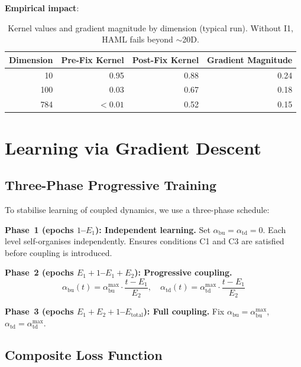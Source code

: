 \documentclass[11pt,a4paper]{article}
\begin{document}
\textbf{Empirical impact}:

\begin{table}[h]
\centering
\begin{tabular}{rrrr}
\toprule
\textbf{Dimension} & \textbf{Pre-Fix Kernel} & \textbf{Post-Fix Kernel} & \textbf{Gradient Magnitude} \\
\midrule
10  & 0.95     & 0.88 & 0.24 \\
100 & 0.03     & 0.67 & 0.18 \\
784 & $<0.01$  & 0.52 & 0.15 \\
\bottomrule
\end{tabular}
\caption{Kernel values and gradient magnitude by dimension (typical run). Without I1, HAML fails beyond $\sim$20D.}
\label{tab:kernelfix}
\end{table}

\section{Learning via Gradient Descent}

\subsection{Three-Phase Progressive Training}

To stabilise learning of coupled dynamics, we use a three-phase schedule:

\textbf{Phase~1 (epochs $1$--$E_1$): Independent learning.}
Set $\alpha_{\mathrm{bu}} = \alpha_{\mathrm{td}} = 0$.  Each level self-organises
independently.  Ensures conditions C1 and C3 are satisfied before coupling is introduced.

\textbf{Phase~2 (epochs $E_1+1$--$E_1+E_2$): Progressive coupling.}
\begin{equation}
  \alpha_{\mathrm{bu}}(t) = \alpha_{\mathrm{bu}}^{\max} \cdot \frac{t - E_1}{E_2},
  \quad
  \alpha_{\mathrm{td}}(t) = \alpha_{\mathrm{td}}^{\max} \cdot \frac{t - E_1}{E_2}
\end{equation}

\textbf{Phase~3 (epochs $E_1+E_2+1$--$E_{\mathrm{total}}$): Full coupling.}
Fix $\alpha_{\mathrm{bu}} = \alpha_{\mathrm{bu}}^{\max}$,
$\alpha_{\mathrm{td}} = \alpha_{\mathrm{td}}^{\max}$.

\subsection{Composite Loss Function}
\end{document}
